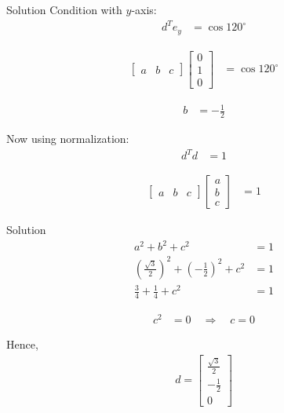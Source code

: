 \documentclass{beamer}
\begin{document}
\begin{frame}{Solution}
Condition with $y$-axis:
\begin{align}
d^T e_y &= \cos 120^\circ 
\end{align}


\begin{align}
\begin{bmatrix} a & b & c \end{bmatrix}
\begin{bmatrix} 0 \\ 1 \\ 0 \end{bmatrix} &= \cos 120^\circ 
\end{align}


\begin{align}
b &= -\tfrac{1}{2} 
\end{align}

Now using normalization:
\begin{align}
d^T d &= 1 
\end{align}

\begin{align}
\begin{bmatrix} a & b & c \end{bmatrix}
\begin{bmatrix} a \\ b \\ c \end{bmatrix} & = 1 
\end{align}
\end{frame}

\begin{frame}{Solution}
\begin{align}
a^2 + b^2 + c^2 &= 1 \\
\left(\tfrac{\sqrt{3}}{2}\right)^2 + \left(-\tfrac{1}{2}\right)^2 + c^2 &= 1 \\
\tfrac{3}{4} + \tfrac{1}{4} + c^2 &= 1 
\end{align}

\begin{align}
c^2 &= 0 \quad \Rightarrow \quad c = 0
\end{align}

Hence,
\begin{align}
d = \begin{bmatrix} \tfrac{\sqrt{3}}{2} \\[6pt] -\tfrac{1}{2} \\[6pt] 0 \end{bmatrix}
\end{align}
\end{frame}
\end{document}
